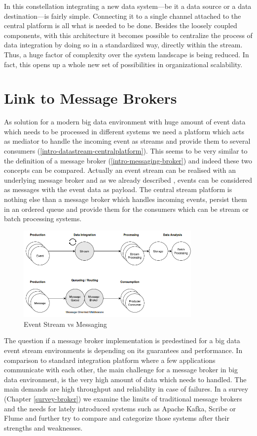 In this constellation integrating a new data system---be it a data
source or a data destination---is fairly simple. Connecting it to a single
channel attached to the central platform is all what is needed to be done. Besides the
loosely coupled components, with this architecture it becomes possible to
centralize the process of data integration by doing so in a standardized way,
directly within the stream. Thus, a huge factor of complexity over the system
landscape is being reduced. In fact, this opens up a whole new set of
possibilities in organizational scalability. 

\newpage
\section{Link to Message Brokers}
As solution for a modern big data environment with huge amount of event data
which needs to be processed in different systems we need a platform which acts as
mediator to handle the incoming event as streams and provide them to several
consumers (\ref{intro-datastream-centralplatform}). This seems to be very similar to
the definition of a message broker (\ref{intro-messaging-broker}) and indeed
these two concepts can be compared. Actually an event stream can be realised
with an underlying message broker and as we already described , events
can be considered as messages with the event data as payload. The central stream
platform is nothing else than a message broker which handles incoming events,
persist them in an ordered queue and provide them for the consumers which can be
stream or batch processing systems.
\begin{figure}[H]
    \centering
    \includegraphics[width=0.8\textwidth]{images/messaging-vs-streaming.png}
    \caption{Event Stream vs Messaging}
    \label{fig:messaging-vs-streaming}
\end{figure}
The question if a message broker implementation is predestined for a big data
event stream environments is depending on its guarantees and performance. In
comparison to standard integration platform where a few applications communicate with each
other, the main challenge for a message broker in big data environment, is the
very high amount of data which needs to handled. The main demands are high
throughput and reliability in case of failures. In a survey (Chapter
\ref{survey-broker}) we examine the limits of traditional message brokers and
the needs for lately introduced systems such as Apache Kafka\cite{apachekafka},
Scribe\cite{scribe} or Flume\cite{apacheflume} and further try to compare and
categorize those systems after their strengths and weaknesses.

